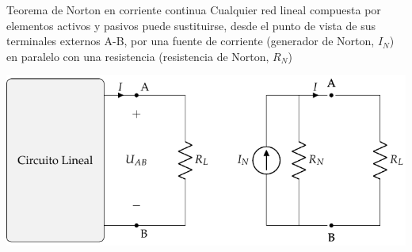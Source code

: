 \documentclass[aspectratio=169, xcolor={usenames,svgnames,dvipsnames}]{beamer}
\begin{document}
\begin{frame}{Teorema de Norton en corriente continua}
    \vspace{3mm}
    Cualquier \alert{red lineal} compuesta por elementos activos y pasivos \alert{puede sustituirse}, desde el punto de vista de sus terminales externos A-B, por una \alert{fuente de corriente} (generador de Norton, \(I_N\)) en \alert{paralelo} con una \alert{resistencia} (resistencia de Norton, \(R_N\))

    \vspace{2mm}   
    \begin{center}
        \includegraphics[height=0.6\textheight]{../figs/EquivalenteNorton_R.pdf}
    \end{center}
\end{frame}

\end{document}
